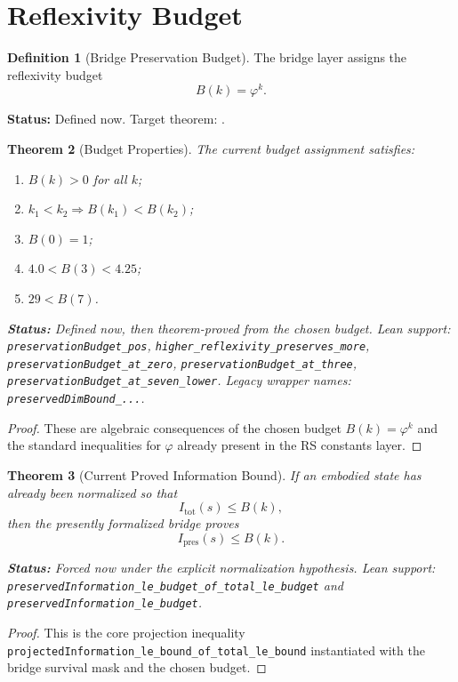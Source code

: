 \documentclass[11pt,a4paper]{article}
\newtheorem{theorem}{Theorem}[section]
\theoremstyle{definition}
\newtheorem{definition}[theorem]{Definition}
\newcommand{\phig}{\varphi}
\newcommand{\code}[1]{\texttt{\small #1}}
\newcommand{\codename}[1]{\texttt{\small\detokenize{#1}}}
\newcommand{\statusline}[1]{\par\smallskip\noindent\textbf{Status:} #1\par\smallskip}
\newcommand{\definednow}[1]{\statusline{Defined now. Target theorem: \codename{#1}.}}
\begin{document}
\section{Reflexivity Budget}
\label{sec:budget}

\begin{definition}[Bridge Preservation Budget]
\label{def:budget}
The bridge layer assigns the reflexivity budget
\[
  B(k)=\phig^k.
\]
\definednow{reflexivity_budget_from_cost}
\end{definition}

\begin{theorem}[Budget Properties]
\label{thm:budget-props}
The current budget assignment satisfies:
\begin{enumerate}[label=(\alph*)]
\item $B(k)>0$ for all $k$;
\item $k_1<k_2 \Rightarrow B(k_1)<B(k_2)$;
\item $B(0)=1$;
\item $4.0 < B(3) < 4.25$;
\item $29 < B(7)$.
\end{enumerate}
\statusline{Defined now, then theorem-proved from the chosen budget.
Lean support: \code{preservationBudget\_pos},
\code{higher\_reflexivity\_preserves\_more},
\code{preservationBudget\_at\_zero},
\code{preservationBudget\_at\_three},
\code{preservationBudget\_at\_seven\_lower}. Legacy wrapper names:
\code{preservedDimBound\_...}.}
\end{theorem}

\begin{proof}
These are algebraic consequences of the chosen budget $B(k)=\phig^k$ and the
standard inequalities for $\phig$ already present in the RS constants layer.
\end{proof}

\begin{theorem}[Current Proved Information Bound]
\label{thm:conditional-bound}
If an embodied state has already been normalized so that
\[
  I_{\mathrm{tot}}(s) \le B(k),
\]
then the presently formalized bridge proves
\[
  I_{\mathrm{pres}}(s) \le B(k).
\]
\statusline{Forced now under the explicit normalization hypothesis. Lean
support: \code{preservedInformation\_le\_budget\_of\_total\_le\_budget}
and \code{preservedInformation\_le\_budget}.}
\end{theorem}

\begin{proof}
This is the core projection inequality
\code{projectedInformation\_le\_bound\_of\_total\_le\_bound} instantiated
with the bridge survival mask and the chosen budget.
\end{proof}
\end{document}
